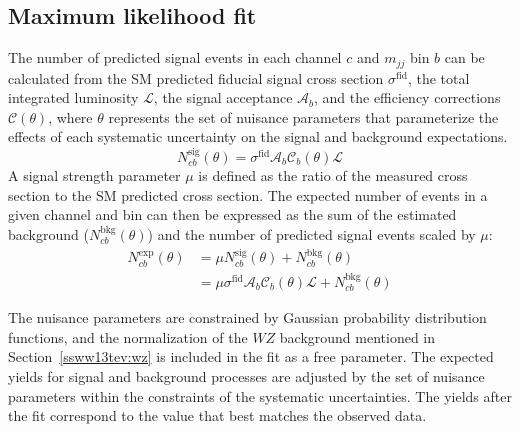 \subsection{Maximum likelihood fit}\label{ssww13tev:xsec_fit_method}
The number of predicted signal events in each channel $c$ and $m_{jj}$ bin $b$ can be calculated from the SM predicted fiducial signal cross section $\sigma^{\textrm{fid}}$, the total integrated luminosity $\mathcal{L}$, the signal acceptance $\mathcal{A}_b$, and the efficiency corrections $\mathcal{C}(\theta)$, where $\theta$ represents the set of nuisance parameters that parameterize the effects of each systematic uncertainty on the signal and background expectations.
\begin{equation}
  N_{cb}^{\textrm{sig}}(\theta) = \sigma^{\textrm{fid}}\mathcal{A}_b\mathcal{C}_{b}(\theta)\mathcal{L}
  \label{eq:ssww13tev_xsec_nsig}
\end{equation}
A signal strength parameter $\mu$ is defined as the ratio of the measured cross section to the SM predicted cross section.
The expected number of events in a given channel and bin can then be expressed as the sum of the estimated background ($N_{cb}^{\textrm{bkg}}(\theta)$) and the number of predicted signal events scaled by $\mu$:
\begin{equation}
  \begin{aligned}
    N_{cb}^{\textrm{exp}}(\theta) &= \mu N_{cb}^{\textrm{sig}}(\theta) + N_{cb}^{\textrm{bkg}}(\theta) \\
                              &= \mu \sigma^{\textrm{fid}}\mathcal{A}_b\mathcal{C}_{b}(\theta)\mathcal{L} + N_{cb}^{\textrm{bkg}}(\theta)
  \end{aligned}
  \label{eq:ssww13tev_xsec_nexp}
\end{equation}

The nuisance parameters are constrained by Gaussian probability distribution functions, and the normalization of the $WZ$ background mentioned in Section~\ref{ssww13tev:wz} is included in the fit as a free parameter.
The expected yields for signal and background processes are adjusted by the set of nuisance parameters within the constraints of the systematic uncertainties.
The yields after the fit correspond to the value that best matches the observed data.

